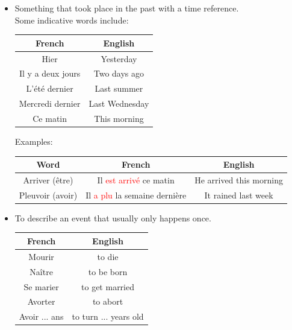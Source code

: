 \documentclass{book}
\begin{document}
\begin{itemize}
    \item Something that took place in the past with a time reference. \\
    Some indicative words include:
    \begin{center}
        \begin{tabular}{|c|c|}
            \hline
            \textbf{French} & \textbf{English} \\
            \hline
            Hier & Yesterday \\
            \hline
            Il y a deux jours & Two days ago \\
            \hline
            L'été dernier & Last summer \\
            \hline
            Mercredi dernier & Last Wednesday \\
            \hline
            Ce matin & This morning \\
            \hline
        \end{tabular}
    \end{center}
    Examples:
    \begin{center}
        \begin{tabular}{|c|c|c|}
            \hline
            \textbf{Word} & \textbf{French} & \textbf{English} \\
            \hline
            Arriver (être) & Il \textcolor{red}{est arrivé} ce matin & He arrived this morning \\
            \hline
            Pleuvoir (avoir) & Il \textcolor{red}{a plu} la semaine dernière & It rained last week \\
            \hline
        \end{tabular}
    \end{center}
    \item To describe an event that usually only happens once.
    \begin{center}
        \begin{tabular}{|c|c|}
            \hline
            \textbf{French} & \textbf{English} \\
            \hline
            Mourir & to die \\
            \hline
            Naître & to be born \\
            \hline
            Se marier & to get married \\
            \hline
            Avorter & to abort \\
            \hline
            Avoir ... ans & to turn ... years old \\

\end{tabular}
\end{center}
\end{itemize}
\end{document}
